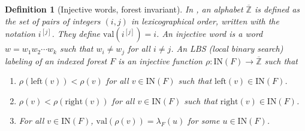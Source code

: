 \documentclass[pdflatex,sn-mathphys-num]{sn-jnl}
\numberwithin{equation}{subsection}
\theoremstyle{thmstyleone}
\theoremstyle{thmstylethree}
\newtheorem{definition}[lemma]{Definition}
\theoremstyle{thmstyletwo}
\begin{document}
\begin{definition}[Injective words, forest invariant]\label{definition:forestinvariant}
In \cite{nadeau2024ppartitions}, an alphabet $\overline{\mathbb{Z}}$ is defined as the set of pairs of integers $(i,j)$ in lexicographical order, written with the notation $i^{[j]}$. They define $\mathrm{val}(i^{[j]})=i$. An \emph{injective word} is a word $w=w_1w_2\cdots w_k$ such that $w_i\neq w_j$ for all $i\neq j$. An \emph{LBS (local binary search) labeling} of an indexed forest $F$ is an injective function $\rho:\mathrm{IN}(F)\to \overline{\mathbb{Z}}$ such that
\begin{enumerate}
\item $\rho(\mathrm{left}(v))<\rho(v)$ for all $v\in \mathrm{IN}(F)$ such that $\mathrm{left}(v)\in \mathrm{IN}(F)$.
\item $\rho(v)<\rho(\mathrm{right}(v))$ for all $v\in \mathrm{IN}(F)$ such that $\mathrm{right}(v)\in \mathrm{IN}(F)$.
\item For all $v\in\mathrm{IN}(F)$, $\mathrm{val}(\rho(v)) = \lambda_F(u)$ for some $u\in\mathrm{IN}(F)$.
\end{enumerate}


\end{definition}
\end{document}
